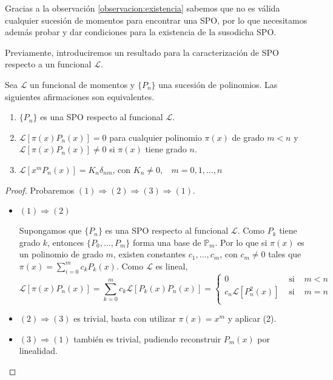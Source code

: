 Gracias a la observación \ref{observacion:existencia} sabemos que no es válida cualquier sucesión de momentos para encontrar una SPO, por lo que necesitamos además probar y dar condiciones para la existencia de la susodicha SPO. 

Previamente, introduciremos un resultado para la caracterización de SPO respecto a un funcional $\mathcal{L}$.

\begin{teorema}
    \label{th:caracterizacion}
Sea $\mathcal{L}$ un funcional de momentos y $\{P_n\}$ una sucesión de polinomios. Las siguientes afirmaciones son equivalentes.
\begin{enumerate}
    \item $\{P_n\}$ es una SPO respecto al funcional $\mathcal{L}$.
    \item $\mathcal{L}[\pi(x)P_n(x)]=0$ para cualquier polinomio $\pi(x)$ de grado $m<n$ y $\mathcal{L}[\pi(x)P_n(x)]\not=0$ si $\pi(x)$ tiene grado $n$.
    \item $\mathcal{L}[x^m P_n(x)]=K_n \delta_{nm}$, con $K_n\not=0, \ \ \ \ m=0,1,\dots,n$
\end{enumerate}
\end{teorema}
\begin{proof}
    Probaremos $(1)\Rightarrow(2)\Rightarrow(3)\Rightarrow(1)$.

    \begin{itemize}
        \item $(1)\Rightarrow(2)$
        
        Supongamos que $\{P_n\}$ es una SPO respecto al funcional $\mathcal{L}$. Como $P_k$ tiene grado $k$, entonces $\{P_0,\dots,P_m\}$ forma una base de $\mathbb P_m$. Por lo que si $\pi(x)$ es un polinomio de grado $m$, existen constantes $c_1,\dots,c_m$, con $c_m\not=0$ tales que $\pi(x)=\sum_{i=0}^m c_k P_k(x)$. Como $\mathcal{L}$ es lineal,
        $$
        \mathcal{L}[\pi(x)P_n(x)]=\sum_{k=0}^m c_k \mathcal{L}[P_k(x) P_n(x)]=\left\lbrace\begin{array}{ccl}
            0 & \text{ si } & m<n \\
            c_n\mathcal{L}[P_n^2(x)] & \text{ si } & m=n \\             
        \end{array}\right.
        $$
        \item $(2)\Rightarrow(3)$ es trivial, basta con utilizar $\pi(x)=x^m$ y aplicar (2).
        \item $(3)\Rightarrow(1)$ también es trivial, pudiendo reconstruir $P_m(x)$ por linealidad. 
    \end{itemize}
\end{proof}

